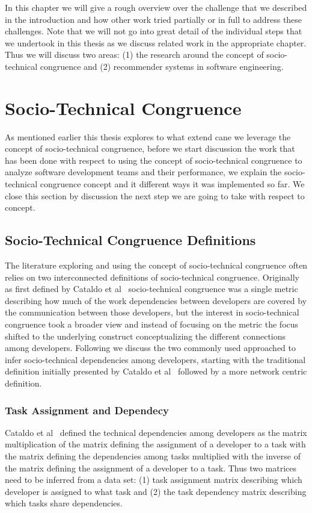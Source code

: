 \label{chap:bg}
In this chapter we will give a rough overview over the challenge that we described in the introduction and how other work tried partially or in full to address these challenges.
Note that we will not go into great detail of the individual steps that we undertook in this thesis as we discuss related work in the appropriate chapter.
Thus we will discuss two areas: (1) the research around the concept of socio-technical congruence and (2) recommender systems in software engineering.

\section{Socio-Technical Congruence}
As mentioned earlier this thesis explores to what extend cane we leverage the concept of socio-technical congruence, before we start discussion the work that has been done with respect to using the concept of socio-technical congruence to analyze software development teams and their performance, we explain the socio-technical congruence concept and it different ways it was implemented so far.
We close this section by discussion the next step we are going to take with respect to concept.

\subsection{Socio-Technical Congruence Definitions}
The literature exploring and using the concept of socio-technical congruence often relies on two interconnected definitions of socio-technical congruence.
Originally as first defined by Cataldo et al~\cite{cataldo:cscw:2006} socio-technical congruence was a single metric describing how much of the work dependencies between developers are covered by the communication between those developers, but the interest in socio-technical congruence took a broader view and instead of focusing on the metric the focus shifted to the underlying construct conceptualizing the different connections among developers.
Following we discuss the two commonly used approached to infer socio-technical dependencies among developers, starting with the traditional definition initially presented by Cataldo et al~\cite{cataldo:cscw:2006} followed by a more network centric definition.

\subsubsection{Task Assignment and Dependecy}
Cataldo et al~\cite{cataldo:cscw:2006} defined the technical dependencies among developers as the matrix multiplication of the matrix defining the assignment of a developer to a task with the matrix defining the dependencies among tasks multiplied with the inverse of the matrix defining the assignment of a developer to a task.
Thus two matrices need to be inferred from a data set: (1) task assignment matrix describing which developer is assigned to what task and (2) the task dependency matrix describing which tasks share dependencies.

